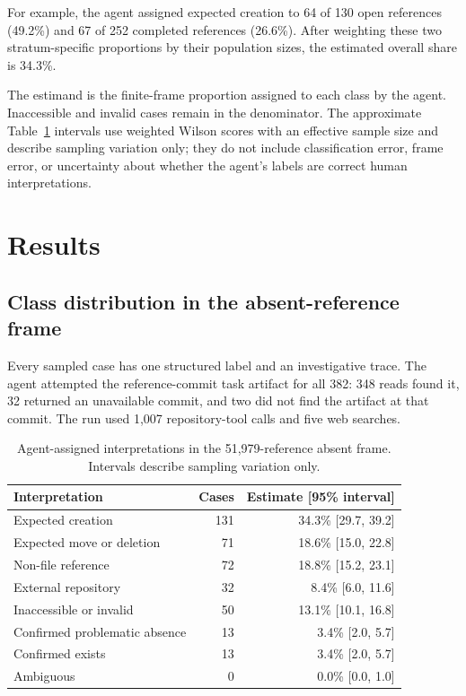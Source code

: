 \documentclass[10pt,conference]{IEEEtran}
\begin{document}
For example, the agent assigned expected creation to 64 of 130 open references (49.2\%) and 67 of 252 completed references (26.6\%). After weighting these two stratum-specific proportions by their population sizes, the estimated overall share is 34.3\%.

The estimand is the finite-frame proportion assigned to each class by the agent. Inaccessible and invalid cases remain in the denominator. The approximate Table~\ref{tab:dist} intervals use weighted Wilson scores with an effective sample size and describe sampling variation only; they do not include classification error, frame error, or uncertainty about whether the agent's labels are correct human interpretations.

\section{Results}
\subsection{Class distribution in the absent-reference frame}
Every sampled case has one structured label and an investigative trace. The agent attempted the reference-commit task artifact for all 382: 348 reads found it, 32 returned an unavailable commit, and two did not find the artifact at that commit. The run used 1,007 repository-tool calls and five web searches.

\begin{table}[t]
\caption{Agent-assigned interpretations in the 51,979-reference absent frame. Intervals describe sampling variation only.}
\label{tab:dist}
\centering\scriptsize
\begin{tabular}{p{3.35cm}rr}
\toprule
\textbf{Interpretation} & \textbf{Cases} & \textbf{Estimate [95\% interval]}\\
\midrule
Expected creation & 131 & 34.3\% [29.7, 39.2]\\
Expected move or deletion & 71 & 18.6\% [15.0, 22.8]\\
Non-file reference & 72 & 18.8\% [15.2, 23.1]\\
External repository & 32 & 8.4\% [6.0, 11.6]\\
Inaccessible or invalid & 50 & 13.1\% [10.1, 16.8]\\
Confirmed problematic absence & 13 & 3.4\% [2.0, 5.7]\\
Confirmed exists & 13 & 3.4\% [2.0, 5.7]\\
Ambiguous & 0 & 0.0\% [0.0, 1.0]\\
\bottomrule
\end{tabular}
\end{table}
\end{document}
